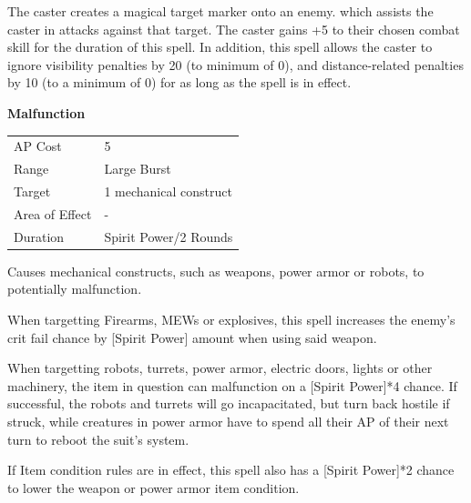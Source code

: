 \documentclass[11pt,a4paper,twocolumn]{book}
\begin{document}
The caster creates a magical target marker onto an enemy. which assists the caster in attacks against that target. The caster gains +5 to their chosen combat skill for the duration of this spell. In addition, this spell allows the caster to ignore visibility penalties by 20 (to minimum of 0), and distance-related penalties by 10 (to a minimum of 0) for as long as the spell is in effect.

\pagebreak
\noindent
\textbf{Malfunction}

\smallskip
{
	\begin{tabu} to 70mm{| X[l,4] | X[l,7] |}
		\hline
        AP Cost	      	& 5 						\\
        Range     		& Large Burst				\\
        Target      	& 1 mechanical construct	\\
        Area of Effect  & -  	 					\\
        Duration     	& Spirit Power/2 Rounds		\\ \hline
	\end{tabu}
		
}
\smallskip

Causes mechanical constructs, such as weapons, power armor or robots, to potentially malfunction.

When targetting Firearms, MEWs or explosives, this spell increases the enemy's crit fail chance by [Spirit Power] amount when using said weapon. 

When targetting robots, turrets, power armor, electric doors, lights or other machinery, the item in question can malfunction on a [Spirit Power]*4 chance. If successful, the robots and turrets will go incapacitated, but turn back hostile if struck, while creatures in power armor have to spend all their AP of their next turn to reboot the suit's system.

If Item condition rules are in effect, this spell also has a [Spirit Power]*2 chance to lower the weapon or power armor item condition.

\bigskip
\vfill

\pagebreak
\end{document}
